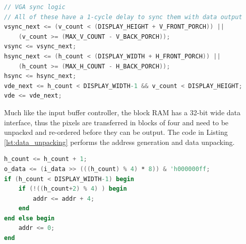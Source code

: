 \begin{lstlisting}[caption={Output buffer controller video synchronisation generation logic.}, label={lst:o_buf_controller_vga_sync}, language=Verilog]
// VGA sync logic
// All of these have a 1-cycle delay to sync them with data output
vsync_next <= (v_count < (DISPLAY_HEIGHT + V_FRONT_PORCH)) ||
    (v_count >= (MAX_V_COUNT - V_BACK_PORCH));
vsync <= vsync_next;
hsync_next <= (h_count < (DISPLAY_WIDTH + H_FRONT_PORCH)) ||
    (h_count >= (MAX_H_COUNT - H_BACK_PORCH));
hsync <= hsync_next;
vde_next <= h_count < DISPLAY_WIDTH-1 && v_count < DISPLAY_HEIGHT;
vde <= vde_next;
\end{lstlisting}

Much like the input buffer controller, the block RAM has a 32-bit wide data interface, thus the pixels are transferred in blocks of four and need to be unpacked and re-ordered before they can be output. The code in Listing \ref{lst:data_unpacking} performs the address generation and data unpacking.

\begin{lstlisting}[caption={Address generation and data unpacking logic for output buffer controller.}, label={lst:data_unpacking}, language=Verilog]
h_count <= h_count + 1;
o_data <= (i_data >> (((h_count) % 4) * 8)) & 'h000000ff;
if (h_count < DISPLAY_WIDTH-1) begin
    if (!((h_count+2) % 4) ) begin
        addr <= addr + 4;
    end
end else begin
    addr <= 0;
end
\end{lstlisting}